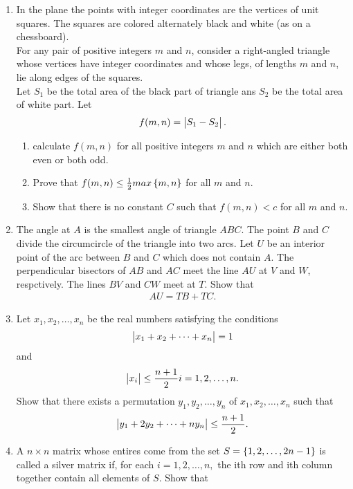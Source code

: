 \documentclass{article}
\begin{document}
\begin{enumerate}
\item In the plane the points with integer coordinates are the vertices of unit squares. The squares are colored alternately black and white (as on a chessboard).\\                     For any pair of positive integers $m$ and $n$, consider a right-angled triangle whose vertices have integer coordinates and whose legs, of lengths $m$ and $n$, lie along edges of the squares.\\                              Let $S_1$ be the total area of the black part of triangle ans $S_2$ be the total area of white part. Let
\begin{align*}
f(m,n)=\begin{vmatrix}S_1-S_2\end{vmatrix}.            
\end{align*}                        
\begin{enumerate}                   
\item calculate $f(m,n)$ for all positive integers $m$ and $n$ which are either both even or both odd.
\item Prove that $f(m,n) \leq \frac{1}{2}max\left\{m,n\right\}$ for all $m$ and $n$.
\item Show that there is no constant $C$ such that $f(m,n)<c$ for all $m$ and $n$.
\end{enumerate}
\item The angle at $A$ is the smallest angle of triangle $ABC$. The point $B$ and $C$ divide the circumcircle of the triangle into two arcs. Let $U$ be an interior point of the arc between $B$ and $C$ which does not contain $A$. The perpendicular bisectors of $AB$ and $AC$ meet the line $AU$ at $V$ and $W$, respctively. The lines $BV$ and $CW$ meet at $T$. Show that 
\begin{align*}
AU=TB+TC.
\end{align*}
\item Let ${x_1,x_2,\dots,x_n}$ be the real numbers satisfying the conditions 
\begin{align*}
\begin{vmatrix}x_1+x_2+\dots+x_n\end{vmatrix}=1
\end{align*}
and
\begin{align*}
\begin{vmatrix}x_i\end{vmatrix}\leq\frac{n+1}{2}      {i=1,2,\dots,n}.
\end{align*}
Show that there exists a permutation ${y_1, y_2,\dots,y_n}$ of ${x_1, x_2,\dots,x_n}$ such that
\begin{align*}
\begin{vmatrix}y_1+2y_2+\dots+ny_n\end{vmatrix}\leq\frac{n+1}{2}.
\end{align*}
\item A $n\times n$ matrix whose entires come from the set $S = \left\{1,2,\dots,2n-1\right\}$ is called a silver matrix if, for each ${i=1,2,\dots,n,}$ the ith row and ith column together contain all elements of $S$. Show that 

\end{enumerate}
\end{document}
